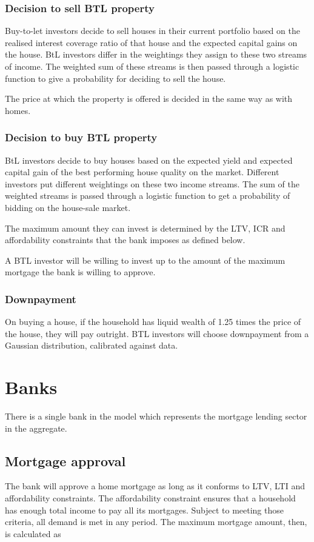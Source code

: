 \documentclass{article}
\begin{document}
\subsubsection{Decision to sell BTL property}

Buy-to-let investors decide to sell houses in their current portfolio based
on the realised interest coverage ratio of that house and the expected
capital gains on the house. BtL investors differ in the weightings they
assign to these two streams of income. The weighted sum of these streams is
then passed through a logistic function to give a probability for deciding
to sell the house.

The price at which the property is offered is decided in the same way as with homes.


\subsubsection{Decision to buy BTL property}

BtL investors decide to buy houses based on the expected yield and expected
capital gain of the best performing house quality on the market. Different
investors put different weightings on these two income streams. The sum of
the weighted streams is passed through a logistic function to get a
probability of bidding on the house-sale market.

The maximum amount they can invest is determined by the LTV, ICR and
affordability constraints that the bank imposes as defined below.

A BTL investor will be willing to invest up to the amount of the maximum mortgage the bank is willing to approve.

\subsubsection{Downpayment}
On buying a house, if the household has liquid wealth of 1.25 times the price of the house, they will pay outright. BTL investors will choose downpayment from a Gaussian distribution, calibrated against data.

\section{Banks}

There is a single bank in the model which represents the mortgage lending
sector in the aggregate.

\subsection{Mortgage approval}
The bank will approve a home mortgage as long as it
conforms to LTV, LTI and affordability constraints. The affordability
constraint ensures that a household has enough total income to pay all its
mortgages. Subject to meeting those criteria, all demand is met in any
period. The maximum mortgage amount, then, is calculated as
\end{document}

